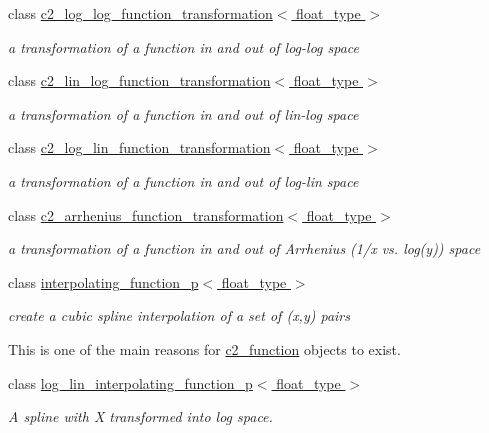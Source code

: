 \begin{DoxyCompactItemize}
class \hyperlink{classc2__log__log__function__transformation}{c2\+\_\+log\+\_\+log\+\_\+function\+\_\+transformation$<$ float\+\_\+type $>$}
\begin{DoxyCompactList}\small\item\em a transformation of a function in and out of log-\/log space \end{DoxyCompactList}\item 
class \hyperlink{classc2__lin__log__function__transformation}{c2\+\_\+lin\+\_\+log\+\_\+function\+\_\+transformation$<$ float\+\_\+type $>$}
\begin{DoxyCompactList}\small\item\em a transformation of a function in and out of lin-\/log space \end{DoxyCompactList}\item 
class \hyperlink{classc2__log__lin__function__transformation}{c2\+\_\+log\+\_\+lin\+\_\+function\+\_\+transformation$<$ float\+\_\+type $>$}
\begin{DoxyCompactList}\small\item\em a transformation of a function in and out of log-\/lin space \end{DoxyCompactList}\item 
class \hyperlink{classc2__arrhenius__function__transformation}{c2\+\_\+arrhenius\+\_\+function\+\_\+transformation$<$ float\+\_\+type $>$}
\begin{DoxyCompactList}\small\item\em a transformation of a function in and out of Arrhenius (1/x vs. log(y)) space \end{DoxyCompactList}\item 
class \hyperlink{classinterpolating__function__p}{interpolating\+\_\+function\+\_\+p$<$ float\+\_\+type $>$}
\begin{DoxyCompactList}\small\item\em create a cubic spline interpolation of a set of (x,y) pairs

This is one of the main reasons for \hyperlink{classc2__function}{c2\+\_\+function} objects to exist. \end{DoxyCompactList}\item 
class \hyperlink{classlog__lin__interpolating__function__p}{log\+\_\+lin\+\_\+interpolating\+\_\+function\+\_\+p$<$ float\+\_\+type $>$}
\begin{DoxyCompactList}\small\item\em A spline with X transformed into log space.


\end{DoxyCompactList}
\end{DoxyCompactItemize}
